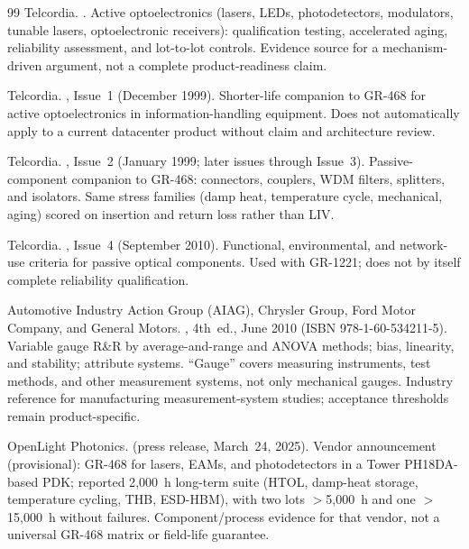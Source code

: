\begin{thebibliography}{99}
Telcordia.
\newblock {}.
\newblock Active optoelectronics (lasers, LEDs, photodetectors, modulators,
tunable lasers, optoelectronic receivers): qualification testing, accelerated
aging, reliability assessment, and lot-to-lot controls. Evidence source for a
mechanism-driven argument, not a complete product-readiness claim.

Telcordia.
\newblock {}, Issue~1 (December 1999).
\newblock Shorter-life companion to GR-468 for active optoelectronics in
information-handling equipment. Does not automatically apply to a current
datacenter product without claim and architecture review.

Telcordia.
\newblock {}, Issue~2 (January 1999; later
issues through Issue~3).
\newblock Passive-component companion to GR-468: connectors, couplers, WDM
filters, splitters, and isolators. Same stress families (damp heat, temperature
cycle, mechanical, aging) scored on insertion and return loss rather than LIV.

Telcordia.
\newblock {}, Issue~4 (September 2010).
\newblock Functional, environmental, and network-use criteria for passive
optical components. Used with GR-1221; does not by itself complete reliability
qualification.

Automotive Industry Action Group (AIAG), Chrysler Group, Ford Motor Company,
and General Motors.
\newblock {},
4th~ed., June 2010 (ISBN 978-1-60-534211-5).
\newblock Variable gauge R\&R by average-and-range and ANOVA methods; bias,
linearity, and stability; attribute systems. ``Gauge'' covers measuring
instruments, test methods, and other measurement systems, not only mechanical
gauges. Industry reference for manufacturing measurement-system studies;
acceptance thresholds remain product-specific.

OpenLight Photonics.
\newblock {} (press release,
March~24, 2025).
\newblock Vendor announcement (provisional): GR-468 for lasers, EAMs, and
photodetectors in a Tower PH18DA-based PDK; reported 2{,}000~h long-term suite
(HTOL, damp-heat storage, temperature cycling, THB, ESD-HBM), with two lots
$>$5{,}000~h and one $>$15{,}000~h without failures. Component/process evidence
for that vendor, not a universal GR-468 matrix or field-life guarantee.


\end{thebibliography}
